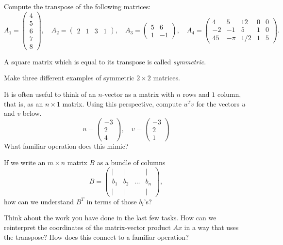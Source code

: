 \documentclass[cahier-main.tex]{subfiles}
\begin{document}
\begin{task}
Compute the transpose of the following matrices:
\[
A_1 = \begin{pmatrix} 4\\ 5 \\ 6\\ 7 \\ 8 \end{pmatrix}, \quad 
A_2 = \begin{pmatrix} 2 & 1 & 3 & 1 \end{pmatrix}, \quad 
A_3 = \begin{pmatrix} 5 & 6 \\ 1 & -1\end{pmatrix}, \quad 
A_4 = \begin{pmatrix} 4 & 5 & 12 & 0 & 0 \\ -2 & -1 & 5 & 1 & 0 \\
45 & -\pi & 1/2 & 1 & 5\end{pmatrix}.
\]
\end{task}

\begin{definition} A square matrix which is equal to its transpose is called \emph{symmetric}.
\end{definition}

\begin{task}
Make three different examples of symmetric $2\times 2$ matrices.
\end{task}

\begin{task}
It is often useful to think of an $n$-vector as a matrix with $n$ rows and $1$ column, that is, as an $n\times 1$ matrix. Using this perspective, compute $u^T v$ for the vectors $u$ and $v$ below.
\[
u = \begin{pmatrix} -3 \\ 2 \\ 4 \end{pmatrix}, \quad v = \begin{pmatrix} -3 \\ 2 \\ 1 \end{pmatrix}
\]
What familiar operation does this mimic?
\end{task}

\begin{task}
If we write an $m\times n$ matrix $B$ as a bundle of columns
\[
B = \begin{pmatrix} | & | & & | \\ b_1 & b_2 & \dots & b_n \\ | & | & & | \end{pmatrix},
\]
how can we understand $B^T$ in terms of those $b_i$'s?
\end{task}

\begin{task}
Think about the work you have done in the last few tasks. How can we reinterpret the coordinates of the matrix-vector product $Ax$ in a way that uses the transpose? How does this connect to a familiar operation?
\end{task}
\end{document}
